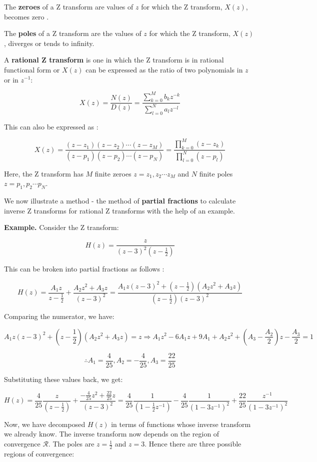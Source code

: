 \documentclass{article}
\theoremstyle{definition}
\newcommand\ddfrac[2]{\frac{\displaystyle #1}{\displaystyle #2}}
\begin{document}
The \textbf{zeroes} of a Z transform are values of $z$ for which the Z transform, $X(z)$, becomes zero . \smallskip

The \textbf{poles} of a Z transform are the values of $z$ for which the Z transform, $X(z)$, diverges or tends to infinity.

A \textbf{rational Z transform} is one in which the Z transform is in rational functional form or $X(z)$ can be expressed as the ratio of two polynomials in $z$ or in $z^{-1}$:

\[
	X(z) = \frac{N(z)}{D(z)} = \ddfrac{\sum_{k=0}^{M} b_k z^{-k}}{\sum_{l=0}^{N} a_l z^{-l}}
\]

This can also be expressed as :

\[
	X(z) = \frac{(z-z_1)(z-z_2) \cdots (z-z_M)}{(z-p_1)(z-p_2) \cdots (z-p_N)} = \ddfrac{\prod_{k=0}^{M} (z-z_k)}{\prod_{l=0}^{N} (z-p_l)}
\]

Here, the Z transform has $M$ finite zeroes $z = z_1,z_2 \cdots z_M$ and $N$ finite poles $z = p_1, p_2 \cdots p_N$. \smallskip

We now illustrate a method - the method of \textbf{partial fractions} to calculate inverse Z transforms for rational Z transforms with the help of an example. 

\textbf{Example.} Consider the Z transform:

\[
	H(z) = \frac{z}{(z-3)^2 (z-\frac{1}{2})}
\]

This can be broken into partial fractions as follows :

\[
	H(z) = \frac{A_1z}{z-\frac{1}{2}} + \frac{A_2z^2 + A_3z}{(z-3)^2} = \frac{A_1z(z-3)^2 + (z-\frac{1}{2})(A_2z^2 + A_3z)}{(z-\frac{1}{2})(z-3)^2}
\]

Comparing the numerator, we have:

\[
	A_1z(z-3)^2 + (z-\frac{1}{2})(A_2z^2 + A_3z) = z \Rightarrow A_1z^2 -6A_1z + 9A_1 + A_2z^2 + (A_3 - \frac{A_2}{2})z - \frac{A_3}{2} = 1
\]

\[
	\therefore A_1 = \frac{4}{25} , A_2 = -\frac{4}{25} , A_3 =\frac{22}{25}
\]

Substituting these values back, we get:

\[
	H(z) = \frac{4}{25} \frac{z}{(z-\frac{1}{2})} + \frac{-\frac{4}{25}z^2 + \frac{22}{25}z}{(z-3)^2} = \frac{4}{25} \frac{1}{(1-\frac{1}{2}z^{-1})} - \frac{4}{25} \frac{1}{(1-3z^{-1})^2} + \frac{22}{25} \frac{z^{-1}}{(1-3z^{-1})^2}
\]	

Now, we have decomposed $H(z)$ in terms of functions whose inverse transform we already know. The inverse transform now depends on the region of convergence $\mathcal{R}$. The poles are $z = \frac{1}{2}$ and $z = 3$. Hence there are three possible regions of convergence:
\end{document}
